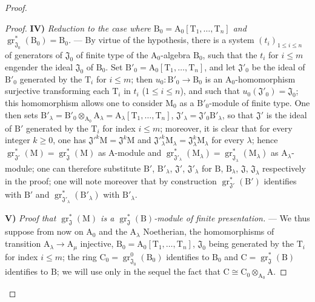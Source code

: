 \begin{proof}
\begin{proof}
\medskip
\noindent\textbf{IV)} \emph{Reduction to the case where $\mathrm{B}_0=\mathrm{A}_0[\mathrm{T}_1,\ldots,\mathrm{T}_n]$ and $\operatorname{gr}^*_{\mathfrak{J}_0}(\mathrm{B}_0)=\mathrm{B}_0$.} --- By virtue of the hypothesis, there is a system $(t_i)_{1\leqslant i\leqslant n}$ of generators of $\mathfrak{J}_0$ of finite type of the $\mathrm{A}_0$-algebra $\mathrm{B}_0$, such that the $t_i$ for $i\leqslant m$ engender the ideal $\mathfrak{J}_0$ of $\mathrm{B}_0$. Set $\mathrm{B}'_0=\mathrm{A}_0[\mathrm{T}_1,\ldots,\mathrm{T}_n]$, and let $\mathfrak{J}'_0$ be the ideal of $\mathrm{B}'_0$ generated by the $\mathrm{T}_i$ for $i\leqslant m$; then $u_0:\mathrm{B}'_0\to\mathrm{B}_0$ is an $\mathrm{A}_0$-homomorphism surjective transforming each $\mathrm{T}_i$ in $t_i$ ($1\leqslant i\leqslant n$), and such that $u_0(\mathfrak{J}'_0)=\mathfrak{J}_0$; this homomorphism allows one to consider $\mathrm{M}_0$ as a $\mathrm{B}'_0$-module of finite type. One then sets $\mathrm{B}'_\lambda=\mathrm{B}'_0\otimes_{\mathrm{A}_0}\mathrm{A}_\lambda=\mathrm{A}_\lambda[\mathrm{T}_1,\ldots,\mathrm{T}_n]$, $\mathfrak{J}'_\lambda=\mathfrak{J}'_0\mathrm{B}'_\lambda$,
so that $\mathfrak{J}'$ is the ideal of $\mathrm{B}'$ generated by the $\mathrm{T}_i$ for index $i\leqslant m$; moreover, it is clear that for every integer $k\geqslant 0$, one has $\mathfrak{J}'^k\mathrm{M}=\mathfrak{J}^k\mathrm{M}$ and $\mathfrak{J}'^k_\lambda\mathrm{M}_\lambda=\mathfrak{J}^k_\lambda\mathrm{M}_\lambda$ for every $\lambda$; hence $\operatorname{gr}^*_{\mathfrak{J}'}(\mathrm{M})=\operatorname{gr}^*_\mathfrak{J}(\mathrm{M})$ as A-module and $\operatorname{gr}^*_{\mathfrak{J}'_\lambda}(\mathrm{M}_\lambda)=\operatorname{gr}^*_{\mathfrak{J}_\lambda}(\mathrm{M}_\lambda)$ as $\mathrm{A}_\lambda$-module; one can therefore substitute $\mathrm{B}'$, $\mathrm{B}'_\lambda$, $\mathfrak{J}'$, $\mathfrak{J}'_\lambda$ for $\mathrm{B}$, $\mathrm{B}_\lambda$, $\mathfrak{J}$, $\mathfrak{J}_\lambda$ respectively in the proof; one will note moreover that by construction $\operatorname{gr}^*_{\mathfrak{J}'}(\mathrm{B}')$ identifies with $\mathrm{B}'$ and $\operatorname{gr}^*_{\mathfrak{J}'_\lambda}(\mathrm{B}'_\lambda)$ with $\mathrm{B}'_\lambda$.

\medskip
\noindent\textbf{V)} \emph{Proof that $\operatorname{gr}^*_\mathfrak{J}(\mathrm{M})$ is a $\operatorname{gr}^*_\mathfrak{J}(\mathrm{B})$-module of finite presentation.} --- We thus suppose from now on $\mathrm{A}_0$ and the $\mathrm{A}_\lambda$ Noetherian, the homomorphisms of transition $\mathrm{A}_\lambda\to\mathrm{A}_\mu$ injective, $\mathrm{B}_0=\mathrm{A}_0[\mathrm{T}_1,\ldots,\mathrm{T}_n]$, $\mathfrak{J}_0$ being generated by the $\mathrm{T}_i$ for index $i\leqslant m$; the ring $\mathrm{C}_0=\operatorname{gr}^0_{\mathfrak{J}_0}(\mathrm{B}_0)$ identifies to $\mathrm{B}_0$ and $\mathrm{C}=\operatorname{gr}^*_\mathfrak{J}(\mathrm{B})$ identifies to $\mathrm{B}$; we will use only in the sequel the fact that $\mathrm{C}\cong\mathrm{C}_0\otimes_{\mathrm{A}_0}\mathrm{A}$.


\end{proof}
\end{proof}
